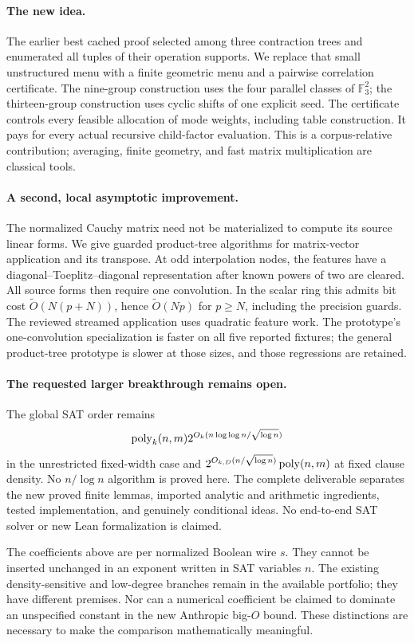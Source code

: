 \paragraph{The new idea.}
The earlier best cached proof selected among three contraction trees and
enumerated all tuples of their operation supports. We replace that small
unstructured menu with a finite geometric menu and a pairwise correlation
certificate. The nine-group construction uses the four parallel classes of
$\mathbb F_3^2$; the thirteen-group construction uses cyclic shifts of one
explicit seed. The certificate controls every feasible allocation of mode
weights, including table construction. It pays for every actual recursive
child-factor evaluation. This is a corpus-relative contribution; averaging,
finite geometry, and fast matrix multiplication are classical tools.

\paragraph{A second, local asymptotic improvement.}
The normalized Cauchy matrix need not be materialized to compute its source
linear forms. We give guarded product-tree algorithms for matrix-vector
application and its transpose. At odd interpolation nodes, the features
have a diagonal--Toeplitz--diagonal representation after known powers of
two are cleared. All source forms then require one convolution. In the
scalar ring this admits bit cost
$\widetilde O(N(p+N))$, hence $\widetilde O(Np)$ for $p\ge N$, including
the precision guards. The reviewed streamed application uses quadratic
feature work. The prototype's one-convolution specialization is faster on
all five reported fixtures; the general product-tree prototype is slower
at those sizes, and those regressions are retained.

\paragraph{The requested larger breakthrough remains open.}
The global SAT order remains
\[
 \operatorname{poly}_k(n,m)2^{O_k(n\log\log n/\sqrt{\log n})}
\]
in the unrestricted fixed-width case and
$2^{O_{k,D}(n/\sqrt{\log n})}\operatorname{poly}(n,m)$ at fixed clause density.
No $n/\log n$ algorithm is proved here. The complete deliverable separates
the new proved finite lemmas, imported analytic and arithmetic ingredients,
tested implementation, and genuinely conditional ideas. No end-to-end SAT
solver or new Lean formalization is claimed.

The coefficients above are per normalized Boolean wire $s$. They cannot be
inserted unchanged in an exponent written in SAT variables $n$. The
existing density-sensitive and low-degree branches remain in the available
portfolio; they have different premises. Nor can a numerical coefficient
be claimed to dominate an unspecified constant in the new Anthropic
big-$O$ bound. These distinctions are necessary to make the comparison
mathematically meaningful.
